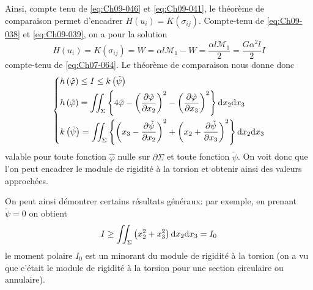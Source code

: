 Ainsi, compte tenu de \eqref{eq:Ch09-046} et \eqref{eq:Ch09-041}, le théorème de comparaison permet d'encadrer $H(u_i) = K(\sigma_{ij})$.
Compte-tenu de \eqref{eq:Ch09-038} et \eqref{eq:Ch09-039}, on a pour la solution 
\begin{equation}
    H(u_i) = K (\sigma_{ij}) = W = \alpha l \mathcal{M}_1 - W = \frac{\alpha l \mathcal{M}_1}{2} = \frac{G\alpha^2 l}{2} I    
    \label{eq:Ch09-047}
\end{equation}
compte-tenu de \eqref{eq:Ch07-064}.
Le théorème de comparaison nous donne donc 
\begin{equation}
    \left\{
    \begin{aligned}
        & h \left( \hat{\varphi} \right) \leq I \leq k \left( \tilde{\psi} \right) \\
        & h \left( \hat{\varphi} \right) = \iint_{\Sigma} \left\{ 4 \hat{\varphi} - \left( \frac{\partial \hat{\varphi}}{\partial x_2} \right)^2 - \left( \frac{\partial \hat{\varphi}}{\partial x_3} \right)^2 \right\} \mathrm{d} x_2 \mathrm{d} x_3 \\
        & k \left( \tilde{\psi} \right) = \iint_{\Sigma} \left\{ \left( x_3 - \frac{\partial \tilde{\psi}}{\partial x_2} \right)^2 + \left( x_2 + \frac{\partial \tilde{\psi}}{\partial x_3} \right)^2 \right\} \mathrm{d} x_2 \mathrm{d} x_3
    \end{aligned}
    \right.
    \label{eq:Ch09-048} 
\end{equation}
valable pour toute fonction $\hat{\varphi}$ nulle sur $\partial \Sigma$ et toute fonction $\tilde{\psi}$.
On voit donc que l'on peut encadrer le module de rigidité à la torsion et obtenir ainsi des valeurs approchées. 

On peut ainsi démontrer certains résultats généraux: par exemple, en prenant $\tilde{\psi} = 0$ on obtient
\begin{equation}
    I \geq \iint_{\Sigma} \left( x_2^2 + x_3^2 \right) \mathrm{d} x_2 \mathrm{d} x_3 = I_0
    \label{eq:Ch09-049}
\end{equation}
le moment polaire $I_0$ est un minorant du module de rigidité à la torsion (on a vu que c'était le module de rigidité à la torsion pour une section circulaire ou annulaire). 

